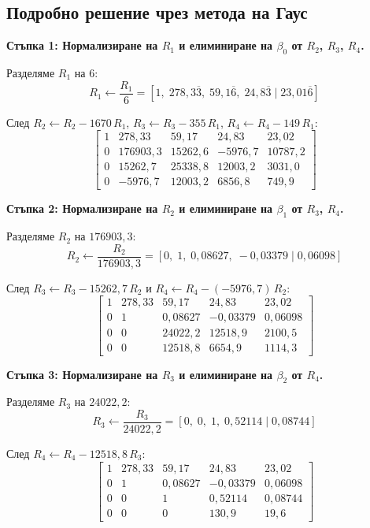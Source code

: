 \subsection{Подробно решение чрез метода на Гаус}

\textbf{Стъпка 1: Нормализиране на $R_1$ и елиминиране на $\beta_0$ от $R_2$, $R_3$, $R_4$.}

Разделяме $R_1$ на 6:
\[
R_1 \leftarrow \frac{R_1}{6} = [1,\; 278{,}3\overline{3},\; 59{,}1\overline{6},\; 24{,}8\overline{3} \mid 23{,}01\overline{6}]
\]

След $R_2 \leftarrow R_2 - 1670\,R_1$,\; $R_3 \leftarrow R_3 - 355\,R_1$,\; $R_4 \leftarrow R_4 - 149\,R_1$:
\[
\left[\begin{array}{cccc|c}
1 & 278{,}33 & 59{,}17 & 24{,}83 & 23{,}02 \\
0 & 176903{,}3 & 15262{,}6 & -5976{,}7 & 10787{,}2 \\
0 & 15262{,}7 & 25338{,}8 & 12003{,}2 & 3031{,}0 \\
0 & -5976{,}7 & 12003{,}2 & 6856{,}8 & 749{,}9
\end{array}\right]
\]

\textbf{Стъпка 2: Нормализиране на $R_2$ и елиминиране на $\beta_1$ от $R_3$, $R_4$.}

Разделяме $R_2$ на $176903{,}3$:
\[
R_2 \leftarrow \frac{R_2}{176903{,}3} = [0,\; 1,\; 0{,}08627,\; -0{,}03379 \mid 0{,}06098]
\]

След $R_3 \leftarrow R_3 - 15262{,}7\,R_2$ и $R_4 \leftarrow R_4 - (-5976{,}7)\,R_2$:
\[
\left[\begin{array}{cccc|c}
1 & 278{,}33 & 59{,}17 & 24{,}83 & 23{,}02 \\
0 & 1 & 0{,}08627 & -0{,}03379 & 0{,}06098 \\
0 & 0 & 24022{,}2 & 12518{,}9 & 2100{,}5 \\
0 & 0 & 12518{,}8 & 6654{,}9 & 1114{,}3
\end{array}\right]
\]

\textbf{Стъпка 3: Нормализиране на $R_3$ и елиминиране на $\beta_2$ от $R_4$.}

Разделяме $R_3$ на $24022{,}2$:
\[
R_3 \leftarrow \frac{R_3}{24022{,}2} = [0,\; 0,\; 1,\; 0{,}52114 \mid 0{,}08744]
\]

След $R_4 \leftarrow R_4 - 12518{,}8\,R_3$:
\[
\left[\begin{array}{cccc|c}
1 & 278{,}33 & 59{,}17 & 24{,}83 & 23{,}02 \\
0 & 1 & 0{,}08627 & -0{,}03379 & 0{,}06098 \\
0 & 0 & 1 & 0{,}52114 & 0{,}08744 \\
0 & 0 & 0 & 130{,}9 & 19{,}6
\end{array}\right]
\]

